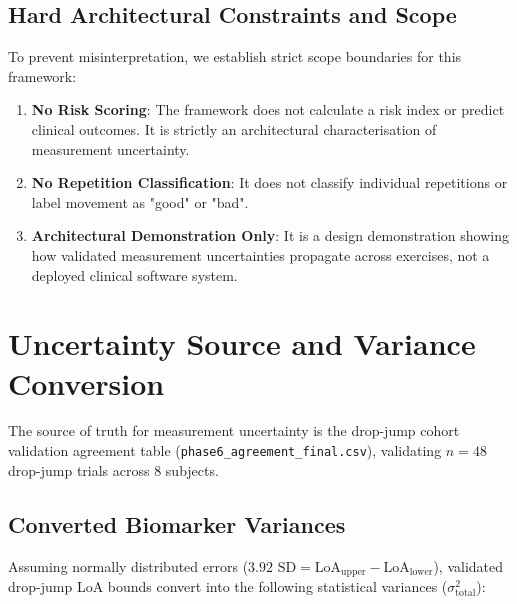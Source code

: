 \subsection{Hard Architectural Constraints and Scope}
\label{sec:8-1-1-hard-architectural-constraints-and-scope}

To prevent misinterpretation, we establish strict scope boundaries for this framework:
\begin{enumerate}
  \item \textbf{No Risk Scoring}: The framework does not calculate a risk index or predict clinical outcomes. It is strictly an architectural characterisation of measurement uncertainty.
  \item \textbf{No Repetition Classification}: It does not classify individual repetitions or label movement as "good" or "bad".
  \item \textbf{Architectural Demonstration Only}: It is a design demonstration showing how validated measurement uncertainties propagate across exercises, not a deployed clinical software system.
\end{enumerate}



\section{Uncertainty Source and Variance Conversion}
\label{sec:8-2-uncertainty-source-and-variance-conversion}


The source of truth for measurement uncertainty is the drop-jump cohort validation agreement table (\texttt{phase6\_agreement\_final.csv}), validating $n = 48$ drop-jump trials across $8$ subjects.

\subsection{Converted Biomarker Variances}
\label{sec:8-2-1-converted-biomarker-variances}

Assuming normally distributed errors ($3.92 \text{ SD} = \text{LoA}_{\text{upper}} - \text{LoA}_{\text{lower}}$), validated drop-jump LoA bounds convert into the following statistical variances ($\sigma^2_{\text{total}}$):

